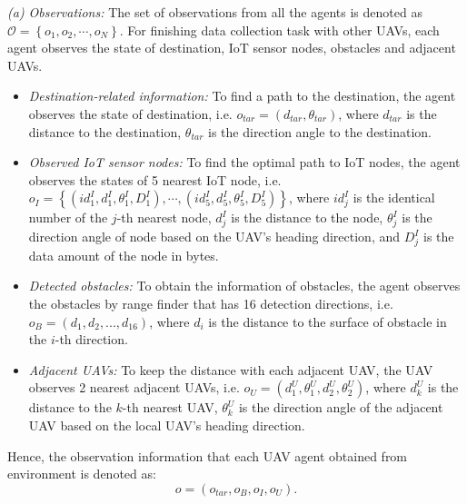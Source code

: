 \documentclass[conference]{IEEEtran}
\begin{document}
\textit{(a) Observations:} The set of observations from all the agents is denoted as $\mathcal{O}=\left\{o_1, o_2, \cdots, o_N\right\}$. For finishing data collection task with other UAVs, each agent observes the state of destination, IoT sensor nodes, obstacles and adjacent UAVs. 
\begin{itemize}
  \item \textit{Destination-related information:} To find a path to the destination, the agent observes the state of destination, i.e. $o_{tar}=\left(d_{tar}, \theta_{tar}\right)$, where $d_{tar}$ is the distance to the destination, $\theta_{tar}$ is the direction angle to the destination. 
  \item \textit{Observed IoT sensor nodes:} To find the optimal path to IoT nodes, the agent observes the states of 5 nearest IoT node, i.e. $o_{I}=\left\{\left({id}^{I}_{1},d^{I}_{1},\theta^{I}_{1},D^{I}_{1}\right),\cdots,\left({id}^{I}_{5},d^{I}_{5},\theta^{I}_{5},D^{I}_{5}\right)\right\}$, where ${id}_{j}^{I}$ is the identical number of the $j$-th nearest node, $d_{j}^{I}$ is the distance to the node, $\theta_{j}^{I}$ is the direction angle of node based on the UAV's heading direction, and $D_{j}^{I}$ is the data amount of the node in bytes. 
  \item \textit{Detected obstacles:} To obtain the information of obstacles, the agent observes the obstacles by range finder that has 16 detection directions, i.e. $o_{B}=\left(d_{1}, d_{2}, ... , d_{16}\right)$, where $d_{i}$ is the distance to the surface of obstacle in the $i$-th direction. 
  \item \textit{Adjacent UAVs:} To keep the distance with each adjacent UAV, the UAV observes 2 nearest adjacent UAVs, i.e. $o_{U}=\left(d_{1}^{U}, \theta_{1}^{U}, d_{2}^{U}, \theta_{2}^{U}\right)$, where $d_{k}^{U}$ is the distance to the $k$-th nearest UAV, $\theta _{k}^{U}$ is the direction angle of the adjacent UAV based on the local UAV's heading direction. 
\end{itemize}
Hence, the observation information that each UAV agent obtained from environment is denoted as: 
\begin{equation}\label{observation}
  o=\left({o_{tar},o_{B},o_{I},o_{U}}\right). 
\end{equation}
\end{document}

